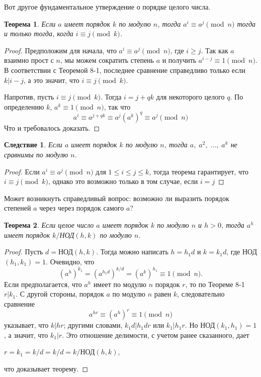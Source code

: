 \documentclass[11pt]{article}
\newtheorem{theorem}{Теорема}
\newtheorem{corollary}{Следствие}
\begin{document}
Вот другое фундаментальное утверждение о порядке целого числа.
\begin{theorem}
	\it Если $a$ имеет порядок $k$ по модулю $n$, тогда $a^i\equiv a^j\pmod{n}$ тогда и только тогда, когда $i\equiv j\pmod{k}$.
\end{theorem}
\begin{proof}
	Предположим для начала, что $a^i\equiv a^j\pmod{n}$, где $i\geq{j}$. Так как $a$ взаимно прост с $n$, мы можем сократить степень $a$ и получить $a^{i-j}\equiv1\pmod{n}$. В соответствии с Теоремой 8-1, последнее сравнение справедливо только если $k|i-j$, а это значит, что $i\equiv j\pmod{k}$.
	
	Напротив, пусть $i\equiv j\pmod{k}$. Тогда $i=j+qk$ для некоторого целого $q$. По определению $k$, $a^k\equiv1\pmod{n}$, так что $$a^i\equiv a^{j+qk}\equiv a^j(a^k)^q \equiv a^j\pmod{n}$$
	Что и требовалось доказать.
\end{proof}
\begin{corollary}
	\it Если $a$ имеет порядок $k$ по модулю $n$, тогда $a,\;a^2,\;...,\;a^k$ не сравнимы по модулю $n$.
\end{corollary}
\newpage
\thispagestyle{fancyEven}
\begin{proof}
	Если $a^i\equiv a^j\pmod{n}$ для $1\leq i\leq j\leq k$, тогда теорема гарантирует, что $i\equiv j\pmod{k}$, однако это возможно только в том случае, если $i=j$
\end{proof}

Может возникнуть справедливый вопрос: возможно ли выразить порядок степеней $a$ через через порядок самого $a$?
\begin{theorem}
	\it Если целое число $a$ имеет порядок $k$ по модулю $n$ и $h>0$, тогда $a^h$ имеет порядок $k/$НОД$(h,k)$ по модулю $n$.
\end{theorem}
\begin{proof}
    Пусть $d=$НОД$(h,k)$. Тогда можно написать $h=h_1d$ и $k=k_1d$, где НОД$(h_1,k_1)=1$. Очевидно, что $$(a^h)^{k_1}=(a^{h_1d})^{k/d}=(a^k)^{h_1}\equiv1\pmod{n}.$$
    Если предполагается, что $a^h$ имеет по модулю $n$ порядок $r$, то по Теореме 8-1 $r|k_1$. С другой стороны, порядок $a$ по модулю $n$ равен $k$, следовательно сравнение $$a^{hr}\equiv(a^h)^r\equiv1\pmod{n}$$ указывает, что $k|hr$; другими словами, $k_1d|h_1dr$ или $k_1|h_1r$. Но НОД$(k_1,h_1)=1$, а значит, что $k_1|r$. Это отношение делимости, с учетом ранее сказанного, дает
    \begin{center}
    $r=k_1=k/d=k/d=k/$НОД$(h,k)$,
    \end{center}
    что доказывает теорему.
\end{proof}
\end{document}
